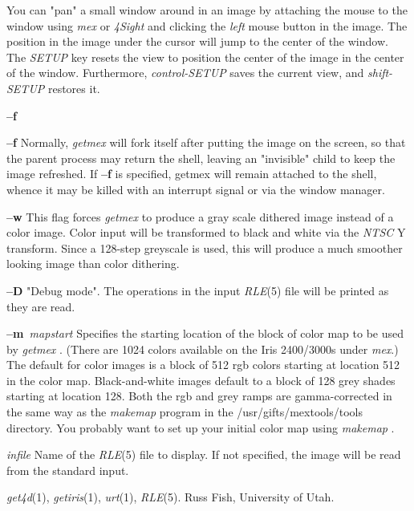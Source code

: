 You can "pan" a small window around in an image by attaching the mouse to
the window using
{\it mex}
or 
{\it 4Sight}
and clicking the
{\it left} mouse button
in the image.  The position in the image
under the cursor will jump to the center of the window.  The
{\it SETUP}
key resets the view to position the center of the image in the center of the
window.  Furthermore,
{\it control-SETUP}
saves the current view, and
{\it shift-SETUP}
restores it.
\begin{TPlist}{{\bf --f}}
\item[{{\bf --f}}]
Normally,
{\it getmex}
will fork itself after putting the image on the screen, so that the
parent process may return the shell, leaving an "invisible" child to
keep the image refreshed.  If 
{\bf --f}
is specified, getmex will remain attached to the shell, whence it may
be killed with an interrupt signal or via
the window manager.
\item[{{\bf --w}}]
This flag forces
{\it getmex}
to produce a gray scale dithered image instead of a color image.
Color input will be transformed to black and white via the
{\it NTSC} Y
transform.  Since a 128-step greyscale is used, this will produce a
much smoother looking image than color dithering.
\item[{{\bf --D}}]
"Debug mode".  The operations in the input
{\it RLE}{\rm (5)}
file will be printed as they are read.
\item[{{\bf --m}{\it \ mapstart}
}]
Specifies the starting location of the block of color map to be used by
{\it getmex} .
(There are 1024 colors available on the Iris 2400/3000s under
{\it mex}{\rm .)}
The default for color images is a block of 512 rgb colors starting at
location 512 in the color map.  Black-and-white images default to a block
of 128 grey shades starting at location 128.  Both the rgb and grey ramps
are gamma-corrected in the same way as the
{\it makemap}
program in the /usr/gifts/mextools/tools directory.  You probably want
to set up your initial color map using
{\it makemap} .
\item[{{\it infile}}]
Name of the
{\it RLE}{\rm (5)}
file to display.  If not specified, the image will be read from the
standard input.
\end{TPlist}
{\it get4d}{\rm (1),}
{\it getiris}{\rm (1),}
{\it urt}{\rm (1),}
{\it RLE}{\rm (5).}
Russ Fish, University of Utah.
\newpage


